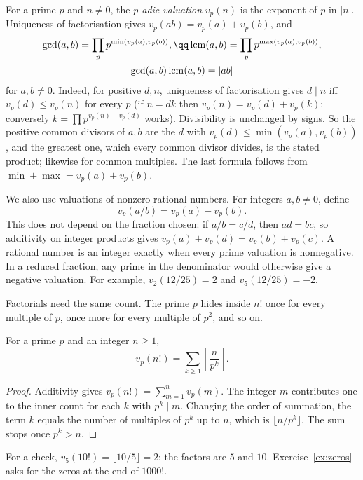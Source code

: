For a prime $p$ and $n\ne0$, the \emph{$p$-adic valuation} $v_p(n)$ is the exponent of $p$ in $|n|$.\label{sym:valuation} Uniqueness of factorisation gives $v_p(ab)=v_p(a)+v_p(b)$, and
\[
\begin{gathered}\gcd(a,b)=\prod_pp^{\min(v_p(a),v_p(b))},\qq\operatorname{lcm}(a,b)=\prod_pp^{\max(v_p(a),v_p(b))},\label{sym:lcm}\\\gcd(a,b)\operatorname{lcm}(a,b)=|ab|\end{gathered}
\]
for $a,b\ne0$. Indeed, for positive $d,n$, uniqueness of factorisation gives $d\mid n$ iff $v_p(d)\le v_p(n)$ for every $p$ (if $n=dk$ then $v_p(n)=v_p(d)+v_p(k)$; conversely $k=\prod p^{v_p(n)-v_p(d)}$ works). Divisibility is unchanged by signs. So the positive common divisors of $a,b$ are the $d$ with $v_p(d)\le\min(v_p(a),v_p(b))$, and the greatest one, which every common divisor divides, is the stated product; likewise for common multiples. The last formula follows from $\min+\max=v_p(a)+v_p(b)$.

We also use valuations of nonzero rational numbers. For integers $a,b\ne0$, define
\[
v_p(a/b)=v_p(a)-v_p(b).
\]
This does not depend on the fraction chosen: if $a/b=c/d$, then $ad=bc$, so additivity on integer products gives $v_p(a)+v_p(d)=v_p(b)+v_p(c)$. A rational number is an integer exactly when every prime valuation is nonnegative. In a reduced fraction, any prime in the denominator would otherwise give a negative valuation. For example, $v_2(12/25)=2$ and $v_5(12/25)=-2$.

Factorials need the same count. The prime $p$ hides inside $n!$ once for every multiple of $p$, once more for every multiple of $p^2$, and so on.

\begin{propositionx}\label{prop:legendre}
For a prime $p$ and an integer $n\ge1$,
\[
v_p(n!)=\sum_{k\ge1}\left\lfloor\frac n{p^k}\right\rfloor.
\]
\end{propositionx}
\begin{proof}
Additivity gives $v_p(n!)=\sum_{m=1}^n v_p(m)$. The integer $m$ contributes one to the inner count for each $k$ with $p^k\mid m$. Changing the order of summation, the term $k$ equals the number of multiples of $p^k$ up to $n$, which is $\lfloor n/p^k\rfloor$. The sum stops once $p^k>n$.
\end{proof}

For a check, $v_5(10!)=\lfloor10/5\rfloor=2$: the factors are $5$ and $10$. Exercise~\ref{ex:zeros} asks for the zeros at the end of $1000!$.

